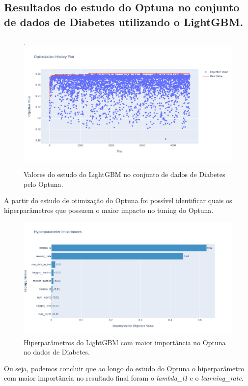 \subsection{Resultados do estudo do Optuna no conjunto de dados de Diabetes utilizando o LightGBM.}
\begin{figure}[H]
 \caption{Valores do estudo do LightGBM no conjunto de dados de Diabetes pelo Optuna.}.
 \label{fig:op:dia:trials:lgbm}
 \centering
 \includegraphics[scale=0.4]{images/optuna_lgbm_dia.png}
\end{figure}
A partir do estudo de otimização do Optuna foi possível identificar quais os hiperparâmetros que possuem o maior impacto no tuning do Optuna.
\begin{figure}[H]
 \caption{Hiperparâmetros do LightGBM com maior importância no Optuna no dados de Diabetes.}
 \label{fig:op:dia:impo:lgbm}
 \centering
 \includegraphics[scale=0.4]{images/importance_lgbm_dia.png}
\end{figure}
Ou seja, podemos concluir que ao longo do estudo do Optuna o hiperparâmetro com maior importância no resultado final foram o \textit{lambda\_l1} e o \textit{learning\_rate}.


